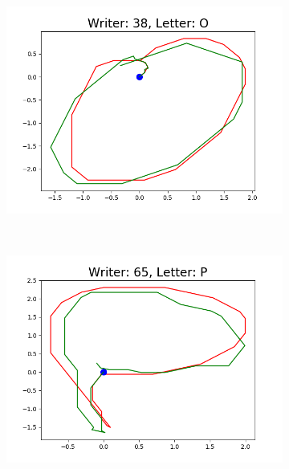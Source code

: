 \begin{figure}
\begin{subfigure}[b]{0.17\textwidth}
          \includegraphics[width=\textwidth]{images/framework/comparison_figures/O_38.png}
      \end{subfigure}
      ~
      \begin{subfigure}[b]{0.17\textwidth}
          \includegraphics[width=\textwidth]{images/framework/comparison_figures/P_65.png}
      \end{subfigure}
      ~
      \begin{subfigure}[b]{0.17\textwidth}

\end{subfigure}
\end{figure}
